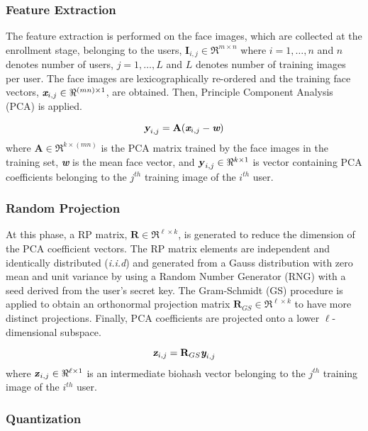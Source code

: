 \documentclass[journal]{IEEEtran}
\begin{document}
\subsubsection{Feature Extraction}

The feature extraction is performed on the face images, which are collected at the enrollment stage, belonging to the users, $\textbf{I}_{i,j}\in\Re^{m\times n}$ where $i=1,\ldots,n$ and $n$ denotes number of users, $j=1,\ldots,L$ and $L$ denotes number of training images per user. The face images are lexicographically re-ordered and the training face vectors, $\textit{\textbf{x}}_{i,j}\in\Re^{(mn)\times1}$, are obtained. Then, Principle Component Analysis (PCA) \cite{Turk} is applied. 

\begin{equation}
 \textsl{\textbf{y}}_{i,j}=\textbf{A}(\textit{\textbf{x}}_{i,j}-\textit{\textbf{w}})
\end{equation}
where $\textbf{A}\in\Re^{k\times(mn)}$ is the PCA matrix trained by the face images in the training set, \textit{\textbf{w}} is the mean face vector, and $\textbf{\textsl{y}}_{i,j}\in\Re^{k\times1}$ is vector containing PCA coefficients belonging to the $j^{th}$ training image of the $i^{th}$ user.

\subsubsection{Random Projection}

At this phase, a RP matrix, $\textbf{R}\in\Re^{\ell\times k}$, is generated to reduce the dimension of the PCA coefficient vectors. The RP matrix elements are independent and identically distributed (\textit{i.i.d}) and generated from a Gauss distribution with zero mean and unit variance by using a Random Number Generator (RNG) with a seed derived from the user's secret key. The Gram-Schmidt (GS) procedure is applied to obtain an orthonormal projection matrix $\textbf{R}_{GS}\in\Re^{\ell \times k}$ to have more distinct projections. Finally, PCA coefficients are projected onto a lower $\ell$-dimensional subspace.

\begin{equation}
 \textsl{\textbf{z}}_{i,j}=\textbf{R}_{GS} \textit{\textbf{y}}_{i,j}
\end{equation}
where $\textbf{\textsl{z}}_{i,j}\in\Re^{\ell\times1}$ is an intermediate biohash vector belonging to the $j^{th}$ training image of the $i^{th}$ user.

\subsubsection{Quantization}
\end{document}
